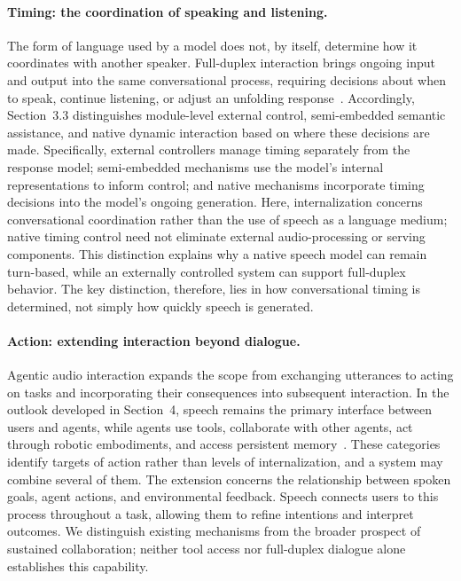 \paragraph{Timing: the coordination of speaking and listening.}
The form of language used by a model does not, by itself, determine how it coordinates with another speaker. Full-duplex interaction brings ongoing input and output into the same conversational process, requiring decisions about when to speak, continue listening, or adjust an unfolding response~\cite{DBLP:conf/emnlp/VeluriPYGG24}. Accordingly, Section~3.3 distinguishes module-level external control, semi-embedded semantic assistance, and native dynamic interaction based on where these decisions are made. Specifically, external controllers manage timing separately from the response model; semi-embedded mechanisms use the model's internal representations to inform control; and native mechanisms incorporate timing decisions into the model's ongoing generation. Here, internalization concerns conversational coordination rather than the use of speech as a language medium; native timing control need not eliminate external audio-processing or serving components. This distinction explains why a native speech model can remain turn-based, while an externally controlled system can support full-duplex behavior. The key distinction, therefore, lies in how conversational timing is determined, not simply how quickly speech is generated.

\paragraph{Action: extending interaction beyond dialogue.}
Agentic audio interaction expands the scope from exchanging utterances to acting on tasks and incorporating their consequences into subsequent interaction. In the outlook developed in Section~4, speech remains the primary interface between users and agents, while agents use tools, collaborate with other agents, act through robotic embodiments, and access persistent memory~\cite{}. These categories identify targets of action rather than levels of internalization, and a system may combine several of them. The extension concerns the relationship between spoken goals, agent actions, and environmental feedback. Speech connects users to this process throughout a task, allowing them to refine intentions and interpret outcomes. We distinguish existing mechanisms from the broader prospect of sustained collaboration; neither tool access nor full-duplex dialogue alone establishes this capability.

